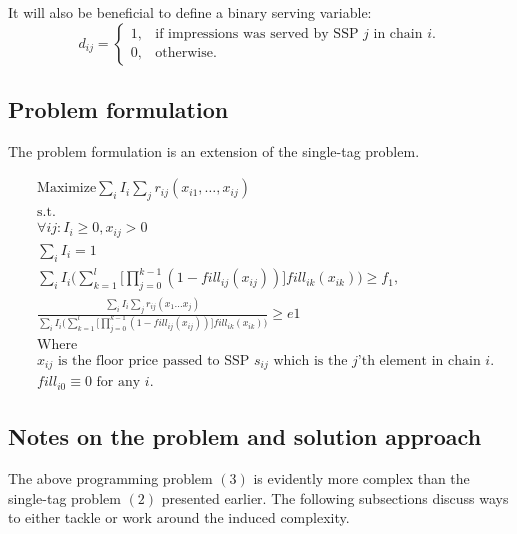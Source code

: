 \documentclass{article}
\begin{document}
\begin{large}
It will also be beneficial to define a binary serving variable: 
\begin{equation*}
 d_{ij} =\begin{cases}
    1, & \text{if impressions was served by SSP $j$ in chain $i$}.\\
    0, & \text{otherwise}.
  \end{cases}
\end{equation*}


\subsection{Problem formulation}
The problem formulation is an extension of the single-tag problem.

\begin{equation}
\begin{aligned}
&\text{Maximize} \sum_{i}{I_i \sum_{j}{r_{ij}(x_{i1},\dots, x_{ij})}}\\
&\text{s.t.} \\ 
&\forall ij: I_i \geq 0 , x_{ij} > 0\\
&\sum_{i}{I_i}=1\\
&\sum_{i}{I_i \Big( \sum_{k=1}^{l}\Big[{\prod_{j=0}^{k-1}{(1-fill_{ij}(x_{ij}))  } \Big] fill_{ik}(x_{ik})}} \Big) \geq f_1,\\ 
&\frac{\sum_{i}{I_i \sum_{j}{r_{ij}(x_1\dots x_j)}}}{\sum_{i}{I_i \Big( \sum_{k=1}^{l}\Big[{\prod_{j=0}^{k-1}{(1-fill_{ij}(x_{ij}))  } \Big] fill_{ik}(x_{ik})}} \Big) } \geq e1 \\
&\text{Where}\\
&\text{$x_{ij}$ is the floor price passed to SSP $s_{ij}$ which is the $j$'th element in chain $i$.}\\
&\text{$fill_{i0} \equiv 0$ for any $i$.}
\end{aligned} 
\end{equation}


\subsection{Notes on the problem and solution approach}
The above programming problem $(3)$ is evidently more complex than the single-tag problem $(2)$ presented earlier. The following subsections discuss ways to either tackle or work around the induced complexity. 


\end{large}
\end{document}
